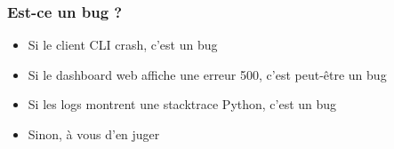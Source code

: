   \begin{frame}
    \frametitle{Est-ce un bug ?}
    \begin{itemize}
      \item Si le client CLI crash, c'est un bug\pause
      \item Si le dashboard web affiche une erreur 500, c'est peut-être un bug\pause
      \item Si les logs montrent une stacktrace Python, c'est un bug\pause
      \item Sinon, à vous d'en juger
    \end{itemize}
  \end{frame}
